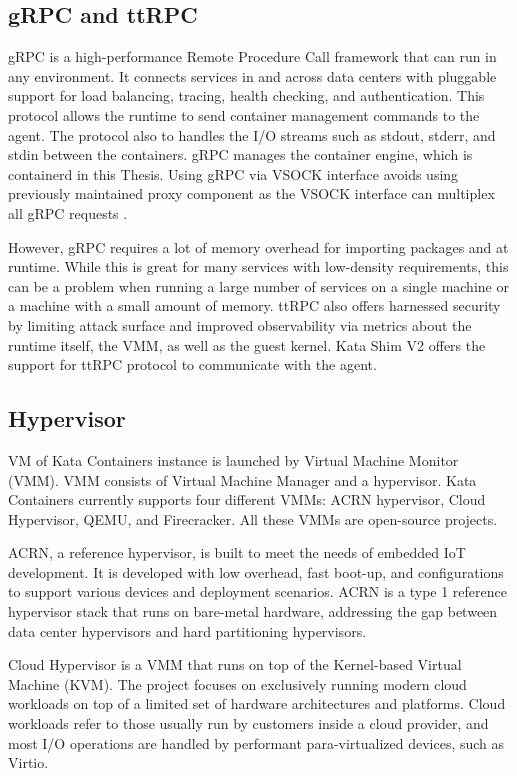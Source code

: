 \subsection{gRPC and ttRPC}

gRPC is a high-performance Remote Procedure Call framework that can run in any environment. It connects services in and across data centers with pluggable support for load balancing, tracing, health checking, and authentication. This protocol allows the runtime to send container management commands to the agent. The protocol also to handles the I/O streams such as stdout, stderr, and stdin between the containers.
gRPC manages the container engine, which is containerd in this Thesis. Using gRPC via VSOCK interface avoids using previously maintained proxy component as the VSOCK interface can multiplex all gRPC requests \cite{Randazzo2019}. \cite{gRPC}\cite{KataContainersArchitecture}

However, gRPC requires a lot of memory overhead for importing packages and at runtime. While this is great for many services with low-density requirements, this can be a problem when running a large number of services on a single machine or a machine with a small amount of memory. ttRPC also offers harnessed security by limiting attack surface and improved observability via metrics about the runtime itself, the VMM, as well as the guest kernel. Kata Shim V2 offers the support for ttRPC protocol to communicate with the agent. \cite{ttRPC}

\subsection{Hypervisor}

VM of Kata Containers instance is launched by Virtual Machine Monitor (VMM). VMM consists of Virtual Machine Manager and a hypervisor. Kata Containers currently supports four different VMMs: ACRN hypervisor, Cloud Hypervisor, QEMU, and Firecracker. All these VMMs are open-source projects.

ACRN, a reference hypervisor, is built to meet the needs of embedded IoT development. It is developed with low overhead, fast boot-up, and configurations to support various devices and deployment scenarios. ACRN is a type 1 reference hypervisor stack that runs on bare-metal hardware, addressing the gap between data center hypervisors and hard partitioning hypervisors. \cite{ACRN}

Cloud Hypervisor is a VMM that runs on top of the Kernel-based Virtual Machine (KVM). The project focuses on exclusively running modern cloud workloads on top of a limited set of hardware architectures and platforms. Cloud workloads refer to those usually run by customers inside a cloud provider, and most I/O operations are handled by performant para-virtualized devices, such as Virtio. \cite{CloudHypervisor}

